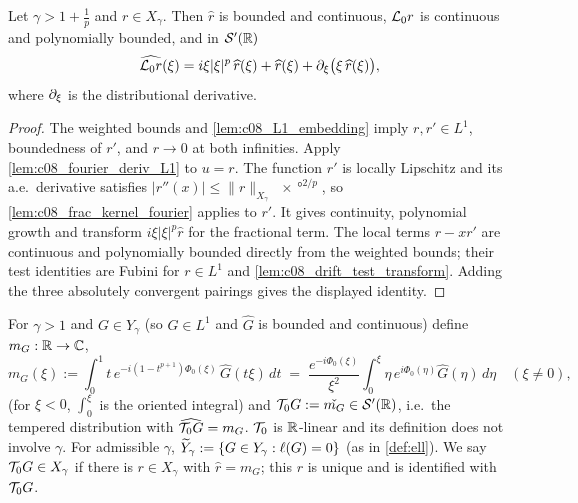 \begin{lemma}
  \label{lem:c08_L0_fourier}
  Let $\gamma>1+\frac1p$ and $r\in X_\gamma$. Then $\widehat r$ is bounded and continuous, $\mathcal{L}_0r$ is continuous and
  polynomially bounded, and in $\mathcal S'(\mathbb{R})$
  \[
    \widehat{\mathcal{L}_0r}(\xi)=i\xi|\xi|^p\,\widehat r(\xi)+\widehat r(\xi)+\partial_\xi\bigl(\xi\,\widehat r(\xi)\bigr),
  \]
  where $\partial_\xi$ is the distributional derivative.
\end{lemma}
\begin{proof}
  The weighted bounds and \cref{lem:c08_L1_embedding} imply $r,r'\in L^1$, boundedness of $r'$, and
  $r\to0$ at both infinities. Apply \cref{lem:c08_fourier_deriv_L1} to $u=r$.
  The function $r'$ is locally Lipschitz and its a.e.\ derivative satisfies
  $|r''(x)|\le\|r\|_{X_\gamma}\ang{x}^{2/p}$, so \cref{lem:c08_frac_kernel_fourier} applies to $r'$.
  It gives continuity, polynomial growth and transform $i\xi|\xi|^p\widehat r$ for the fractional term.
  The local terms $r-xr'$ are continuous and polynomially bounded directly from the weighted bounds;
  their test identities are Fubini for $r\in L^1$ and \cref{lem:c08_drift_test_transform}.
  Adding the three absolutely convergent pairings gives the displayed identity.
\end{proof}

\begin{definition}
  \label{def:T_0}
  For $\gamma>1$ and $G\in Y_\gamma$ (so $G\in L^1$ and $\widehat G$ is bounded and continuous) define
  $m_G:\mathbb{R}\to\mathbb{C}$,
  \begin{equation}\label{eqn:linear_free_inverse}
    m_G(\xi):=\int_0^1t\,e^{-i(1-t^{p+1})\Phi_0(\xi)}\,\widehat G(t\xi)\,dt
    \;=\;\frac{e^{-i\Phi_0(\xi)}}{\xi^2}\int_0^\xi\eta\,e^{i\Phi_0(\eta)}\widehat G(\eta)\,d\eta\quad(\xi\neq0),
  \end{equation}
  (for $\xi<0$, $\int_0^\xi$ is the oriented integral) and $\mathcal{T}_0G:=\check{m_G}\in\mathcal S'(\mathbb{R})$, i.e.\ the tempered distribution
  with $\widehat{\mathcal{T}_0G}=m_G$. $\mathcal{T}_0$ is $\mathbb{R}$-linear and its definition does not involve $\gamma$. For admissible $\gamma$,
  $\widetilde{Y}_\gamma:=\{G\in Y_\gamma:\ell(G)=0\}$ (as in \cref{def:ell}). We say $\mathcal{T}_0G\in X_\gamma$ if there is
  $r\in X_\gamma$ with $\widehat r=m_G$; this $r$ is unique and is identified with $\mathcal{T}_0G$.
\end{definition}

